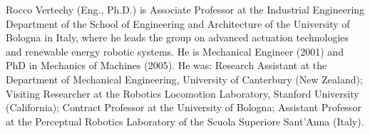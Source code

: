 \documentclass[journal]{IEEEtran}
\begin{document}
\begin{IEEEbiography}{Rocco Vertechy} (Eng., Ph.D.)  is Associate Professor at the Industrial Engineering Department of the School of Engineering and Architecture of the University of Bologna in Italy, where he leads the group on advanced actuation technologies and renewable energy robotic systems. He is Mechanical Engineer (2001) and PhD in Mechanics of Machines (2005). He was: Research Assistant at the Department of Mechanical Engineering, University of Canterbury (New Zealand); Visiting Researcher at the Robotics Locomotion Laboratory, Stanford University (California); Contract Professor at the University of Bologna; Assistant Professor at the Perceptual Robotics Laboratory of the Scuola Superiore Sant’Anna (Italy).
	
\end{IEEEbiography}

\end{document}
